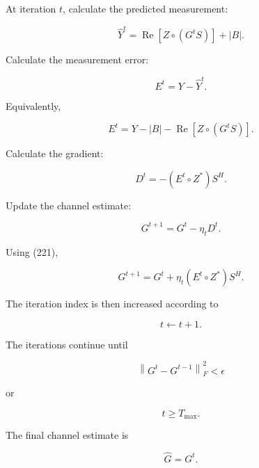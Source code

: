 \documentclass[12pt,a4paper]{article}
\begin{document}
At iteration $t$, calculate the predicted measurement:

\begin{equation}
\boxed{
\widehat{Y}^{t}
=
\operatorname{Re}
[Z\circ(G^{t}S)]
+
|B|
}.
\tag{218}
\end{equation}

Calculate the measurement error:

\begin{equation}
\boxed{
E^{t}
=
Y-\widehat{Y}^{t}
}.
\tag{219}
\end{equation}

Equivalently,

\begin{equation}
\boxed{
E^{t}
=
Y-|B|
-
\operatorname{Re}
[Z\circ(G^{t}S)]
}.
\tag{220}
\end{equation}

Calculate the gradient:

\begin{equation}
\boxed{
D^{t}
=
-
(E^{t}\circ Z^{*})S^{H}
}.
\tag{221}
\end{equation}

Update the channel estimate:

\begin{equation}
\boxed{
G^{t+1}
=
G^{t}
-
\eta_tD^{t}
}.
\tag{222}
\end{equation}

Using (221),

\begin{equation}
\boxed{
G^{t+1}
=
G^{t}
+
\eta_t
(E^{t}\circ Z^{*})S^{H}
}.
\tag{223}
\end{equation}

The iteration index is then increased according to

\begin{equation}
t\leftarrow t+1.
\tag{224}
\end{equation}

The iterations continue until

\begin{equation}
\boxed{
\left\|
G^{t}-G^{t-1}
\right\|_{F}^{2}
<
\epsilon
}
\tag{225}
\end{equation}

or

\begin{equation}
t\geq T_{\max}.
\tag{226}
\end{equation}

The final channel estimate is

\begin{equation}
\boxed{
\widehat{G}=G^{t}
}.
\tag{227}
\end{equation}
\end{document}
